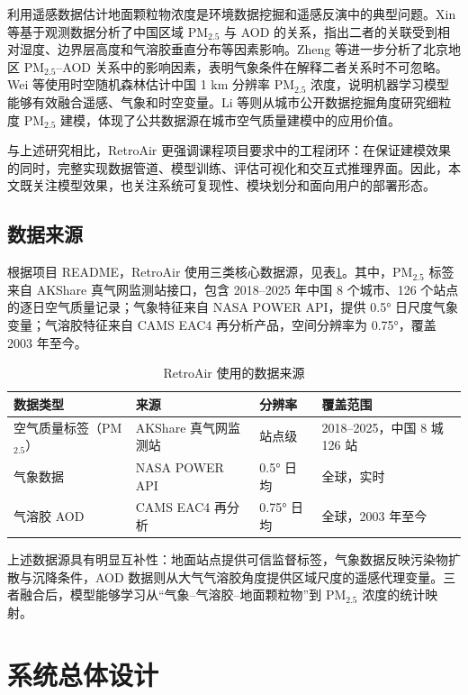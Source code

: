 \documentclass[UTF8,zihao=-4,a4paper]{ctexart}
\newcommand{\pmfine}{PM$_{2.5}$}
\newcommand{\aod}{AOD}
\begin{document}
利用遥感数据估计地面颗粒物浓度是环境数据挖掘和遥感反演中的典型问题。Xin 等\cite{xin2016}基于观测数据分析了中国区域 \pmfine{} 与 \aod{} 的关系，指出二者的关联受到相对湿度、边界层高度和气溶胶垂直分布等因素影响。Zheng 等\cite{zheng2017}进一步分析了北京地区 \pmfine{}--\aod{} 关系中的影响因素，表明气象条件在解释二者关系时不可忽略。Wei 等\cite{wei2019}使用时空随机森林估计中国 1 km 分辨率 \pmfine{} 浓度，说明机器学习模型能够有效融合遥感、气象和时空变量。Li 等\cite{li2017}则从城市公开数据挖掘角度研究细粒度 \pmfine{} 建模，体现了公共数据源在城市空气质量建模中的应用价值。

与上述研究相比，RetroAir 更强调课程项目要求中的工程闭环：在保证建模效果的同时，完整实现数据管道、模型训练、评估可视化和交互式推理界面。因此，本文既关注模型效果，也关注系统可复现性、模块划分和面向用户的部署形态。

\subsection{数据来源}

根据项目 README，RetroAir 使用三类核心数据源，见表\ref{tab:data_source}。其中，\pmfine{} 标签来自 AKShare 真气网监测站接口，包含 2018--2025 年中国 8 个城市、126 个站点的逐日空气质量记录；气象特征来自 NASA POWER API，提供 0.5° 日尺度气象变量；气溶胶特征来自 CAMS EAC4 再分析产品，空间分辨率为 0.75°，覆盖 2003 年至今。

\begin{table}[H]
  \centering
  \caption{RetroAir 使用的数据来源}
  \label{tab:data_source}
  \small
  \begin{tabularx}{\textwidth}{lllX}
    \toprule
    数据类型 & 来源 & 分辨率 & 覆盖范围 \\
    \midrule
    空气质量标签（\pmfine{}） & AKShare 真气网监测站 & 站点级 & 2018--2025，中国 8 城 126 站 \\
    气象数据 & NASA POWER API & 0.5° 日均 & 全球，实时 \\
    气溶胶 \aod{} & CAMS EAC4 再分析 & 0.75° 日均 & 全球，2003 年至今 \\
    \bottomrule
  \end{tabularx}
\end{table}

上述数据源具有明显互补性：地面站点提供可信监督标签，气象数据反映污染物扩散与沉降条件，\aod{} 数据则从大气气溶胶角度提供区域尺度的遥感代理变量。三者融合后，模型能够学习从“气象--气溶胶--地面颗粒物”到 \pmfine{} 浓度的统计映射。

\section{系统总体设计}
\end{document}
